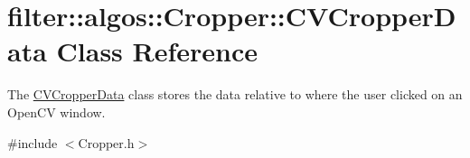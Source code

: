 \hypertarget{classfilter_1_1algos_1_1_cropper_1_1_c_v_cropper_data}{}\section{filter\+:\+:algos\+:\+:Cropper\+:\+:C\+V\+Cropper\+Data Class Reference}
\label{classfilter_1_1algos_1_1_cropper_1_1_c_v_cropper_data}


The \hyperlink{classfilter_1_1algos_1_1_cropper_1_1_c_v_cropper_data}{C\+V\+Cropper\+Data} class stores the data relative to where the user clicked on an Open\+CV window.  




{\ttfamily \#include $<$Cropper.\+h$>$}

